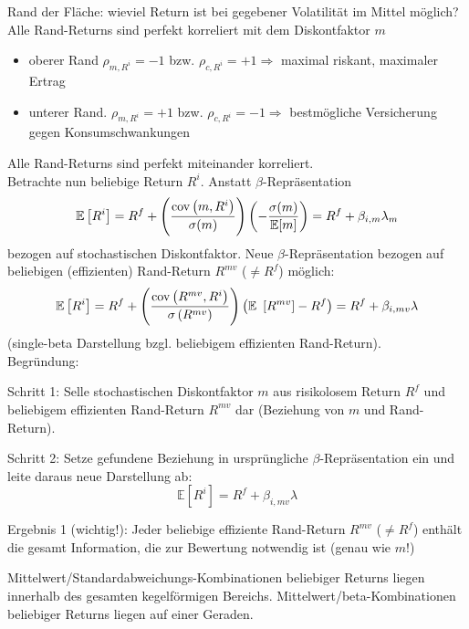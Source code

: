 \documentclass[12pt]{extreport} %
\theoremstyle{named}
\theoremstyle{nnamed}
\theoremstyle{itshape}
\theoremstyle{normal}
\begin{document}
Rand der Fläche: wieviel Return ist bei gegebener Volatilität im Mittel möglich? Alle Rand-Returns sind perfekt korreliert mit dem Diskontfaktor $m$
\begin{itemize}
	\item oberer Rand $\rho_{m, R^i} = -1$ bzw. $\rho_{c, R^i} = +1 \Rightarrow$ maximal riskant, maximaler Ertrag
	\item unterer Rand. $\rho_{m, R^i} = +1$ bzw. $\rho_{c, R^i} = -1 \Rightarrow$ bestmögliche Versicherung gegen Konsumschwankungen
\end{itemize}	
Alle Rand-Returns sind perfekt miteinander korreliert. ~\\

Betrachte nun beliebige Return $R^i$. Anstatt $\beta$-Repräsentation
	$$ \mathbb{E}\left[ R^i \right] = R^f + \left( \frac{\operatorname{cov} \left( m, R^i \right)}{\sigma(m)} \right) \left( - \frac{\sigma(m)}{\mathbb{E}[m]} \right) = R^f + \beta_{i, m} \lambda_m $$
bezogen auf stochastischen Diskontfaktor. Neue $\beta$-Repräsentation bezogen auf beliebigen (effizienten) Rand-Return $R^{mv}$ ($\neq R^f$) möglich:	
	$$ \mathbb{E} \left[ R^i \right] = R^f + \left( \frac{\cov \left( R^{mv}, R^i \right)}{\var \left( R^{mv} \right)} \right) \left( \mathbb{E} \left[ R^{mv} \right] - R^f \right) = R^f + \beta_{i, mv} \lambda $$
(single-beta Darstellung bzgl. beliebigem effizienten Rand-Return). ~\\

Begründung:
\begin{description}
	\item Schritt 1: Selle stochastischen Diskontfaktor $m$ aus risikolosem Return $R^f$ und beliebigem effizienten Rand-Return $R^{mv}$ dar (Beziehung von $m$ und Rand-Return).
	\item Schritt 2: Setze gefundene Beziehung in ursprüngliche $\beta$-Repräsentation ein und leite daraus neue Darstellung ab:
		$$ \mathbb{E} \left[ R^i \right] = R^f + \beta_{i, mv} \lambda $$
\end{description}
\begin{description}
	\item Ergebnis 1 (wichtig!): Jeder beliebige effiziente Rand-Return $R^{mv}$ ($\neq R^f$) enthält die gesamt Information, die zur Bewertung notwendig ist (genau wie $m$!)
	\item Mittelwert/Standardabweichungs-Kombinationen beliebiger Returns liegen innerhalb des gesamten kegelförmigen Bereichs. Mittelwert/beta-Kombinationen beliebiger Returns liegen auf einer Geraden.
\end{description}
\end{document}
